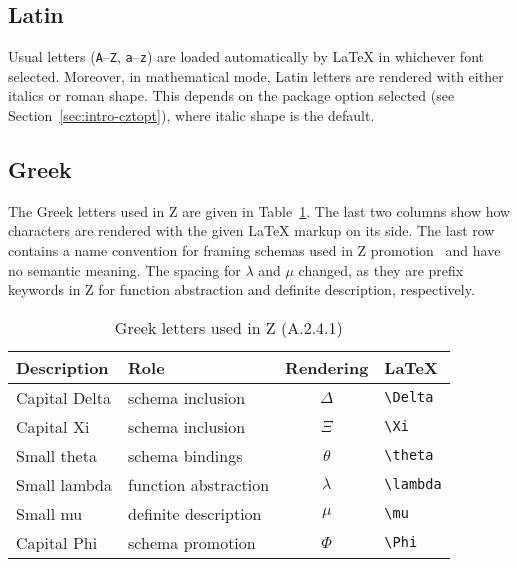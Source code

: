 \documentclass{article}
\newcommand{\smallcaption}[1]{{\small (#1)}}
\begin{document}
\subsection{Latin}\label{sec:letters-latin}

Usual letters (\texttt{A}--\texttt{Z}, \texttt{a}--\texttt{z}) are
loaded automatically by \LaTeX{} in whichever font selected.
Moreover, in mathematical mode, Latin letters are rendered with either
italics or roman shape. This depends on the package option selected
(see Section~\ref{sec:intro-cztopt}), where italic shape is the default.

\subsection{Greek}\label{sec:letters-greek}

The Greek letters used in Z are given in Table~\ref{tbl:letters-greek}.
The last two columns show how characters are rendered with the given
\LaTeX{} markup on its side. The last row contains a name convention for
framing schemas used in Z promotion~\cite[Ch.~13]{usingz} and have no semantic meaning.
The spacing for $\lambda$ and $\mu$ changed, as they are prefix keywords in Z
for function abstraction and definite description, respectively.
%
\begin{table}[ht]
\centering
\begin{tabular}{|l|l|c|l|}
   \hline
   \textbf{Description} & \textbf{Role} & \textbf{Rendering} & \textbf{\LaTeX} \\
   \hline
   Capital Delta & schema inclusion         & $\Delta$  & \verb|\Delta| \\
   \hline
   Capital Xi    & schema inclusion         & $\Xi$     & \verb|\Xi| \\
   \hline
   Small theta   & schema bindings          & $\theta$  & \verb|\theta| \\
   \hline
   Small lambda  & function abstraction     & $\lambda$ & \verb|\lambda| \\
   \hline
   Small mu      & definite description     & $\mu$ & \verb|\mu| \\
   \hline
   Capital Phi   & schema promotion         & $\Phi$    & \verb|\Phi| \\
   \hline
\end{tabular}
\caption{Greek letters used in Z \smallcaption{A.2.4.1}}\label{tbl:letters-greek}
\end{table}
\end{document}
